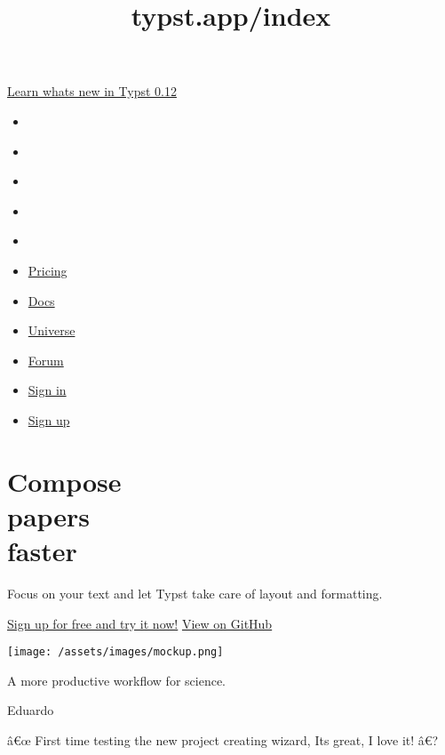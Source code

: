 \title{typst.app/index}

\href{https://typst.app/blog/2024/typst-0.12/}{Learn
what\textquotesingle s new in Typst 0.12}

\href{/\#start}{}

\begin{itemize}
\tightlist
\item
  \href{https://github.com/typst/}{}
\item
  \href{https://discord.gg/2uDybryKPe}{}
\item
  \href{https://mastodon.social/@typst}{}
\item
  \href{https://bsky.app/profile/typst.app}{}
\item
  \href{https://www.linkedin.com/company/typst/}{}
\item
  \href{/pricing/}{Pricing}
\item
  \href{/docs/}{Docs}
\item
  \href{/universe/}{Universe}
\item
  \href{https://forum.typst.app}{Forum}
\item
  \href{/signin/}{Sign in}
\item
  \label{header-btn}\href{/signup}{Sign up}
\end{itemize}

\label{start}
\section[Compose\\
\strut \\
faster]{\texorpdfstring{Compose\\
\protect\hypertarget{change}{}{ { papers } }\\
faster}{Compose   papers   faster}}\label{compose-papers-faster}

Focus on your text and let Typst take care of layout and formatting.

\href{/signup}{Sign up for free and try it now!}
\href{https://github.com/typst/typst}{View on GitHub}

\texttt{[image: /assets/images/mockup.png]}

\label{social-proof}
A more productive workflow for science.

Eduardo

â€œ First time testing the new project creating wizard,
It\textquotesingle s great, I love it! â€?

